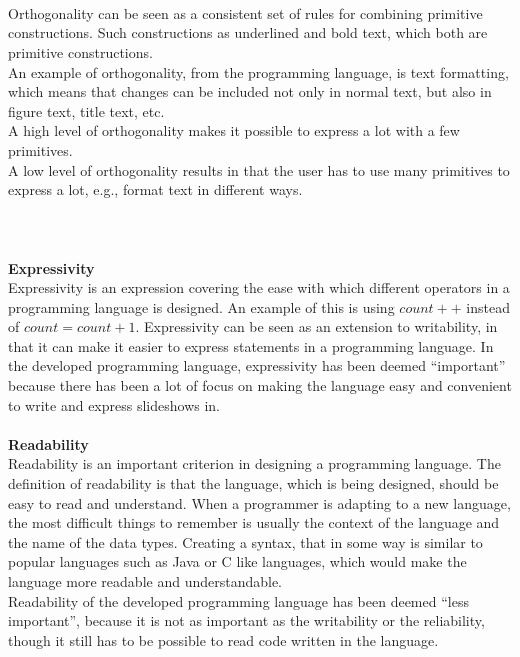 \\ \\
 \\
Orthogonality can be seen as a consistent set of rules for combining primitive constructions. Such constructions as underlined and bold text, which both are primitive constructions. \\
An example of orthogonality, from the programming language, is text formatting, which means that changes can be included not only in normal text, but also in figure text, title text, etc. \\
A high level of orthogonality makes it possible to express a lot with a few primitives. \\
A low level of orthogonality results in that the user has to use many primitives to express a lot, e.g., format text in different ways.
\\ \\
\\ \\
\textbf{Expressivity} \\
Expressivity is an expression covering the ease with which different operators in a programming language is designed. An example of this is using $count++$ instead of $count = count + 1$. Expressivity can
be seen as an extension to writability, in that it can make it easier to express statements in a programming language. In the developed programming language, expressivity has been deemed ``important'' because there has been a lot of focus on making the language easy and convenient to write and express slideshows in.
\\ \\
\textbf{Readability} \\
Readability is an important criterion in designing a programming language. The definition of readability is that the language, which is being designed, should be easy to read and understand. When a programmer is adapting to a new language, the most difficult things to remember is usually the context of the language and the name of the data types. Creating a syntax, that in some way is similar to popular languages such as Java or C like languages, which would make the language more readable and understandable. \\
Readability of the developed programming language has been deemed ``less important'', because it is not as important as the writability or the reliability, though it still has to be possible to read code written in the language.

